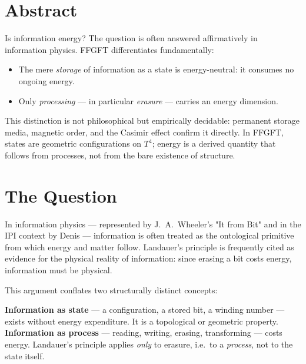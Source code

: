 
\section*{Abstract}

Is information energy? The question is often answered affirmatively in
information physics. FFGFT differentiates fundamentally:

\begin{itemize}
  \item The mere \emph{storage} of information as a state is energy-neutral:
        it consumes no ongoing energy.
  \item Only \emph{processing} — in particular \emph{erasure} — carries an
        energy dimension.
\end{itemize}

This distinction is not philosophical but empirically decidable: permanent
storage media, magnetic order, and the Casimir effect confirm it directly.
In FFGFT, states are geometric configurations on $T^4$; energy is a derived
quantity that follows from processes, not from the bare existence of structure.

\section{The Question}

In information physics — represented by J.~A.~Wheeler's "It from Bit"
\cite{Wheeler1990} and in the IPI context by Denis \cite{Denis2023} —
information is often treated as the ontological primitive from which
energy and matter follow. Landauer's principle \cite{Landauer1961} is
frequently cited as evidence for the physical reality of information:
since erasing a bit costs energy, information must be physical.

This argument conflates two structurally distinct concepts:

\begin{keyresult}
\textbf{Information as state} — a configuration, a stored bit, a winding
number — exists without energy expenditure. It is a topological or geometric
property.\\
\textbf{Information as process} — reading, writing, erasing, transforming
— costs energy. Landauer's principle applies \emph{only} to erasure, i.e.\
to a \emph{process}, not to the state itself.
\end{keyresult}

